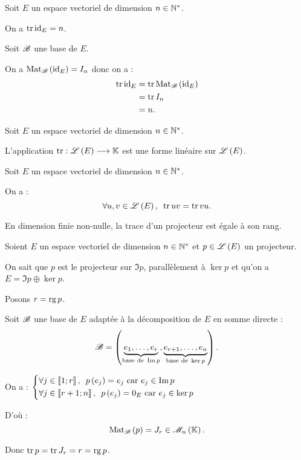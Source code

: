 \begin{ex}
Soit \(E\) un espace vectoriel de dimension \(n\in\mathbb{N}^*\).

On a \(\operatorname{tr}\mathrm{id}_{E}=n\).
\end{ex}

\begin{dem}
Soit \(\mathscr{B}\) une base de \(E\).

On a \(\Mat{\id{E}}=I_n\) donc on a : \[\begin{aligned}
\tr\id{E}&=\tr\Mat{\id{E}} \\
&=\tr I_n \\
&=n.
\end{aligned}\]
\end{dem}

\begin{prop}
Soit \(E\) un espace vectoriel de dimension \(n\in\mathbb{N}^*\).

L'application \(\operatorname{tr}:\mathscr{L}\left(E\right)\longrightarrow\mathbb{K}\) est une forme linéaire sur \(\mathscr{L}\left(E\right)\).
\end{prop}

\begin{prop}
Soit \(E\) un espace vectoriel de dimension \(n\in\mathbb{N}^*\).

On a : \[\quantifs{\forall u,v\in\Lendo{E}}\tr uv=\tr vu.\]
\end{prop}

\begin{prop}
En dimension finie non-nulle, la trace d'un projecteur est égale à son rang.
\end{prop}

\begin{dem}
Soient \(E\) un espace vectoriel de dimension \(n\in\mathbb{N}^*\) et \(p\in\mathscr{L}\left(E\right)\) un projecteur.

On sait que \(p\) est le projecteur sur \(\Im p\), parallèlement à \(\ker p\) et qu'on a \(E=\Im p\oplus\ker p\).

Posons \(r=\operatorname{rg} p\).

Soit \(\mathscr{B}\) une base de \(E\) adaptée à la décomposition de \(E\) en somme directe : \[\mathscr{B}=\left(\underbrace{e_1,\dots,e_r}_{\text{base de }\operatorname{Im} p},\underbrace{e_{r+1},\dots,e_n}_{\text{base de }\ker p}\right).\]

On a : \(\begin{dcases}
\quantifs{\forall j\in\interventierii{1}{r}}p\paren{e_j}=e_j\text{ car }e_j\in\Im p \\
\quantifs{\forall j\in\interventierii{r+1}{n}}p\paren{e_j}=0_E\text{ car }e_j\in\ker p
\end{dcases}\)

D'où : \[\Mat{p}=J_r\in\M{n}.\]

Donc \(\operatorname{tr} p=\operatorname{tr} J_r=r=\operatorname{rg} p\).
\end{dem}

